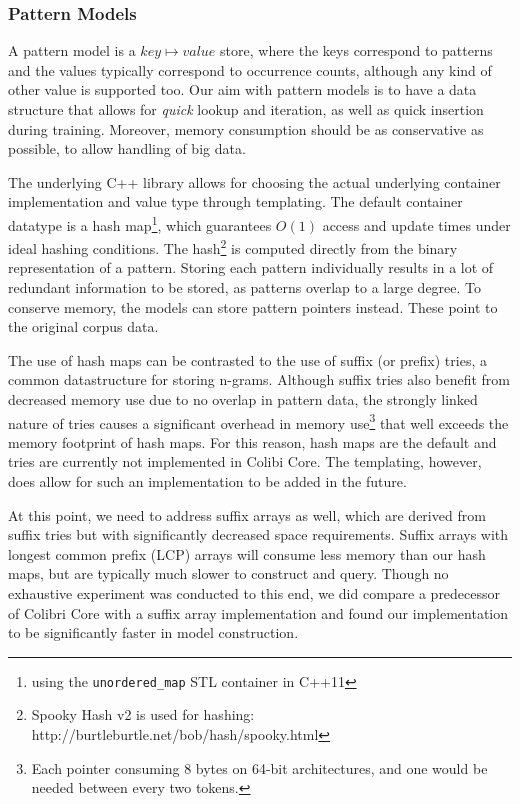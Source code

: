 \documentclass[a4paper,12pt]{article}
\begin{document}
\subsubsection{Pattern Models}

A pattern model is a $key \mapsto value$ store, where the keys correspond to
patterns and the values typically correspond to occurrence counts, although any
kind of other value is supported too. Our aim with pattern models is to have a
data structure that allows for \emph{quick} lookup and iteration, as well as
quick insertion during training. Moreover, memory consumption should be as
conservative as possible, to allow handling of big data.

The underlying C++ library allows for choosing the actual underlying container
implementation and value type through templating. The default container
datatype is a hash map\footnote{using the \texttt{unordered\_map} STL container
in C++11}, which guarantees $O(1)$ access and update times under ideal hashing
conditions. The hash\footnote{Spooky Hash v2 is used for hashing:
http://burtleburtle.net/bob/hash/spooky.html} is computed directly from the
binary representation of a pattern. Storing each pattern individually results
in a lot of redundant information to be stored, as patterns overlap to a large
degree. To conserve memory, the models can store pattern pointers
instead. These point to the
original corpus data.

The use of hash maps can be contrasted to the use of suffix (or prefix) tries,
a common datastructure for storing n-grams. Although suffix tries also benefit
from decreased memory use due to no overlap in pattern data, the strongly
linked nature of tries causes a significant overhead in memory
use\footnote{Each pointer consuming 8 bytes on 64-bit architectures, and one
would be needed between every two tokens.} that well exceeds the memory
footprint of hash maps.  For this reason, hash maps are the default and tries
are currently not implemented in Colibi Core. The templating, however, does
allow for such an implementation to be added in the future.

At this point, we need to address suffix arrays \cite{Manber90} as well, which
are derived from suffix tries but with significantly decreased space
requirements. Suffix arrays with longest common prefix (LCP) arrays will
consume less memory than our hash maps, but are typically much slower to
construct and query. Though no exhaustive experiment was conducted to this
end, we did compare a predecessor of Colibri Core with a suffix array implementation
\cite{Stehouwer10} and found our implementation to be significantly faster in model
construction.
\end{document}
